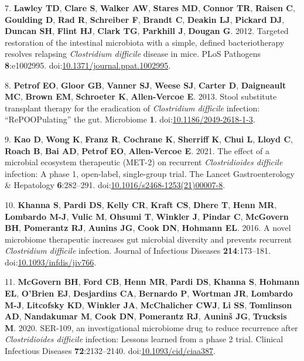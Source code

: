 \documentclass[
  12pt,
]{article}
\newenvironment{cslreferences}%
  {}%
  {\par}
\begin{document}
\begin{cslreferences}
\leavevmode\hypertarget{ref-Lawley2012}{}%
7. \textbf{Lawley TD}, \textbf{Clare S}, \textbf{Walker AW},
\textbf{Stares MD}, \textbf{Connor TR}, \textbf{Raisen C},
\textbf{Goulding D}, \textbf{Rad R}, \textbf{Schreiber F},
\textbf{Brandt C}, \textbf{Deakin LJ}, \textbf{Pickard DJ},
\textbf{Duncan SH}, \textbf{Flint HJ}, \textbf{Clark TG},
\textbf{Parkhill J}, \textbf{Dougan G}. 2012. Targeted restoration of
the intestinal microbiota with a simple, defined bacteriotherapy
resolves relapsing \emph{Clostridium difficile} disease in mice. PLoS
Pathogens \textbf{8}:e1002995.
doi:\href{https://doi.org/10.1371/journal.ppat.1002995}{10.1371/journal.ppat.1002995}.

\leavevmode\hypertarget{ref-Petrof2013}{}%
8. \textbf{Petrof EO}, \textbf{Gloor GB}, \textbf{Vanner SJ},
\textbf{Weese SJ}, \textbf{Carter D}, \textbf{Daigneault MC},
\textbf{Brown EM}, \textbf{Schroeter K}, \textbf{Allen-Vercoe E}. 2013.
Stool substitute transplant therapy for the eradication of
\emph{Clostridium difficile} infection: ``RePOOPulating'' the gut.
Microbiome \textbf{1}.
doi:\href{https://doi.org/10.1186/2049-2618-1-3}{10.1186/2049-2618-1-3}.

\leavevmode\hypertarget{ref-Kao2021}{}%
9. \textbf{Kao D}, \textbf{Wong K}, \textbf{Franz R}, \textbf{Cochrane
K}, \textbf{Sherriff K}, \textbf{Chui L}, \textbf{Lloyd C},
\textbf{Roach B}, \textbf{Bai AD}, \textbf{Petrof EO},
\textbf{Allen-Vercoe E}. 2021. The effect of a microbial ecosystem
therapeutic (MET-2) on recurrent \emph{Clostridioides difficile}
infection: A phase 1, open-label, single-group trial. The Lancet
Gastroenterology \& Hepatology \textbf{6}:282--291.
doi:\href{https://doi.org/10.1016/s2468-1253(21)00007-8}{10.1016/s2468-1253(21)00007-8}.

\leavevmode\hypertarget{ref-Khanna2016}{}%
10. \textbf{Khanna S}, \textbf{Pardi DS}, \textbf{Kelly CR},
\textbf{Kraft CS}, \textbf{Dhere T}, \textbf{Henn MR}, \textbf{Lombardo
M-J}, \textbf{Vulic M}, \textbf{Ohsumi T}, \textbf{Winkler J},
\textbf{Pindar C}, \textbf{McGovern BH}, \textbf{Pomerantz RJ},
\textbf{Aunins JG}, \textbf{Cook DN}, \textbf{Hohmann EL}. 2016. A novel
microbiome therapeutic increases gut microbial diversity and prevents
recurrent \emph{Clostridium difficile} infection. Journal of Infectious
Diseases \textbf{214}:173--181.
doi:\href{https://doi.org/10.1093/infdis/jiv766}{10.1093/infdis/jiv766}.

\leavevmode\hypertarget{ref-McGovern2020}{}%
11. \textbf{McGovern BH}, \textbf{Ford CB}, \textbf{Henn MR},
\textbf{Pardi DS}, \textbf{Khanna S}, \textbf{Hohmann EL},
\textbf{O'Brien EJ}, \textbf{Desjardins CA}, \textbf{Bernardo P},
\textbf{Wortman JR}, \textbf{Lombardo M-J}, \textbf{Litcofsky KD},
\textbf{Winkler JA}, \textbf{McChalicher CWJ}, \textbf{Li SS},
\textbf{Tomlinson AD}, \textbf{Nandakumar M}, \textbf{Cook DN},
\textbf{Pomerantz RJ}, \textbf{Auninš JG}, \textbf{Trucksis M}. 2020.
SER-109, an investigational microbiome drug to reduce recurrence after
\emph{Clostridioides difficile} infection: Lessons learned from a phase
2 trial. Clinical Infectious Diseases \textbf{72}:2132--2140.
doi:\href{https://doi.org/10.1093/cid/ciaa387}{10.1093/cid/ciaa387}.


\end{cslreferences}
\end{document}
